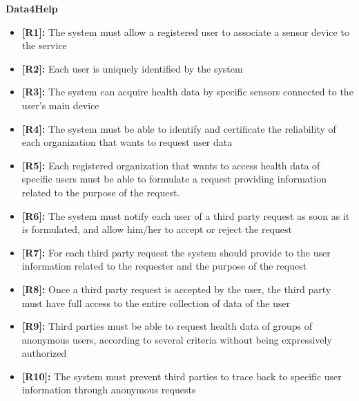 {}
\textbf{Data4Help}
\begin{itemize}
\item\textbf{[R1]:} The system must allow a registered user to associate a sensor device to the service
\item\textbf{[R2]:} Each user is uniquely identified by the system
\item\textbf{[R3]:} The system can acquire health data by specific sensors connected to the user's main device
\item\textbf{[R4]:} The system must be able to identify and certificate the reliability of each organization that wants to request user data
\item\textbf{[R5]:} Each registered organization that wants to access health data of specific users must be able to formulate a request providing information related to the purpose of the request.
\item\textbf{[R6]:} The system must notify each user of a third party request as soon as it is formulated, and allow him/her to accept or reject the request
\item\textbf{[R7]:} For each third party request the system should provide to the user information related to the requester and the purpose of the request
\item\textbf{[R8]:} Once a third party request is accepted by the user, the third party must have full access to the entire collection of data of the user
\item\textbf{[R9]:} Third parties must be able to request health data of groups of anonymous users, according to several criteria without being expressively authorized
\item\textbf{[R10]:} The system must prevent third parties to trace back to specific user information through anonymous requests
\end{itemize}
